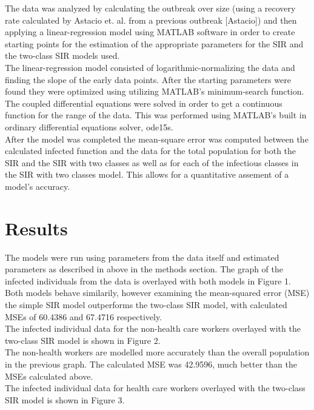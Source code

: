 \documentclass[twoside]{article}
\begin{document}
\begin{multicols}{2}
	The data was analyzed by calculating the outbreak over size (using a recovery rate calculated by
	 Astacio et. al. from a previous outbreak [Astacio]) and then applying a linear-regression model using 
	MATLAB software in order to create starting points for the estimation of the appropriate parameters for
	the SIR and the two-class SIR models used.\\

	 The linear-regression model consisted of logarithmic-normalizing the data and finding the slope of the
	 early data points. After the starting parameters were found they were optimized using utilizing
	 MATLAB's minimum-search function. The coupled differential equations were solved in order
	to get a continuous function for the range of the data. This was performed using MATLAB's built in
	ordinary differential equations solver, ode15s.\\

	After the model was completed the mean-square error was computed between the calculated infected function and
	the data for the total population for both the SIR and the SIR with two classes as well as for each of 
	the infectious classes in the SIR with two classes model. This allows for a quantitative assement of a 
	model's accuracy.




\section{Results}

	The models were run using parameters from the data itself and estimated parameters as described in
	above in the methods section. The graph of the infected individuals from the data is overlayed 
	with both models in Figure 1.\\

	Both models behave similarily, however examining the mean-squared error (MSE) the
	simple SIR model outperforms the two-class SIR model, with calculated MSEs of 60.4386 and 67.4716 respectively.\\
	The infected individual data for the non-health care workers overlayed with the two-class SIR model 
	is shown in Figure 2.\\
	
	The non-health workers are modelled more accurately than the overall population
	in the previous graph. The calculated MSE was 42.9596, much better than the MSEs calculated above.\\
	The infected individual data for health care workers overlayed with the two-class SIR model is
	shown in Figure 3.\\


\end{multicols}
\end{document}
